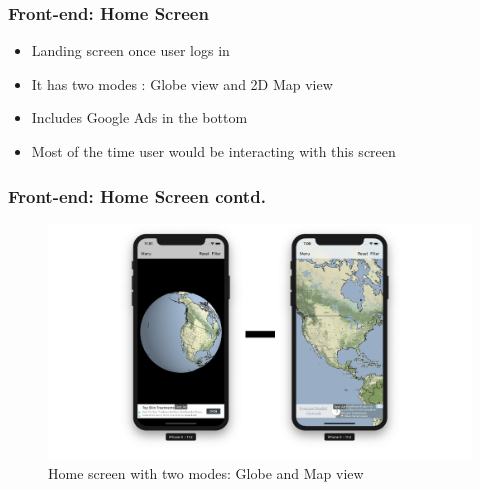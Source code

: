 \begin{frame}
\frametitle{Front-end: Home Screen}
   \begin{itemize}
       \item Landing screen once user logs in
       \item It has two modes : Globe view and 2D Map view
       \item Includes Google Ads in the bottom
       \item Most of the time user would be interacting with this screen
   \end{itemize}
\end{frame}

\begin{frame}
\frametitle{Front-end: Home Screen contd.}
   \begin{figure}[H]
            \centering
            \includegraphics[width=0.95\linewidth]{final/figures/home_modes.png}
            \caption{Home screen with two modes: Globe and Map view}
    \end{figure}
\end{frame}